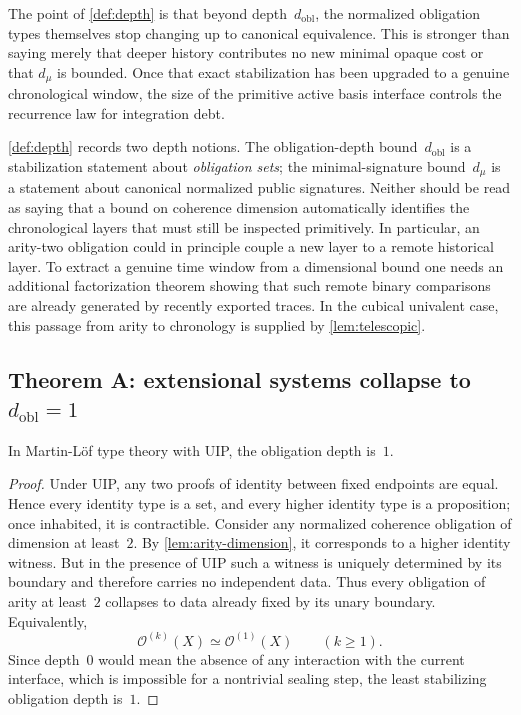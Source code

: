 \documentclass{lmcs}
\newcommand{\Ocal}{\mathcal{O}}
\begin{document}
The point of \autoref{def:depth} is that beyond depth~$d_{\mathrm{obl}}$, the normalized obligation types themselves stop changing up to canonical equivalence. This is stronger than saying merely that deeper history contributes no new minimal opaque cost or that $d_\mu$ is bounded. Once that exact stabilization has been upgraded to a genuine chronological window, the size of the primitive active basis interface controls the recurrence law for integration debt.

\begin{rem}
\label{rem:arity-vs-chronology}
\autoref{def:depth} records two depth notions. The obligation-depth bound~$d_{\mathrm{obl}}$ is a stabilization statement about \emph{obligation sets}; the minimal-signature bound~$d_\mu$ is a statement about canonical normalized public signatures. Neither should be read as saying that a bound on coherence dimension automatically identifies the chronological layers that must still be inspected primitively. In particular, an arity-two obligation could in principle couple a new layer to a remote historical layer. To extract a genuine time window from a dimensional bound one needs an additional factorization theorem showing that such remote binary comparisons are already generated by recently exported traces. In the cubical univalent case, this passage from arity to chronology is supplied by \autoref{lem:telescopic}.
\end{rem}

\subsection{\texorpdfstring{Theorem A: extensional systems collapse to $d_{\mathrm{obl}}=1$}{Theorem A: extensional systems collapse to d obl = 1}}

\begin{thm}
\label{thm:extensional}
In Martin-L\"of type theory with UIP, the obligation depth is~$1$.
\end{thm}

\begin{proof}
Under UIP, any two proofs of identity between fixed endpoints are equal. Hence every identity type is a set, and every higher identity type is a proposition; once inhabited, it is contractible. Consider any normalized coherence obligation of dimension at least~$2$. By \autoref{lem:arity-dimension}, it corresponds to a higher identity witness. But in the presence of UIP such a witness is uniquely determined by its boundary and therefore carries no independent data. Thus every obligation of arity at least~$2$ collapses to data already fixed by its unary boundary. Equivalently,
\[
  \Ocal^{(k)}(X) \simeq \Ocal^{(1)}(X)
  \qquad
  (k \geq 1).
\]
Since depth~$0$ would mean the absence of any interaction with the current interface, which is impossible for a nontrivial sealing step, the least stabilizing obligation depth is~$1$.
\end{proof}
\end{document}
